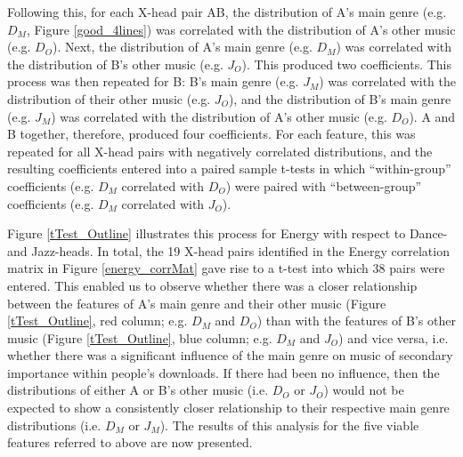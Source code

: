 \documentclass[a4paper]{article}
\begin{document}
Following this, for each X-head pair AB, the distribution of A’s main genre (e.g. $D_M$, Figure \ref{good_4lines}) was correlated with the distribution of A’s other music (e.g. $D_O$). Next, the distribution of A’s main genre (e.g. $D_M$) was correlated with the distribution of B’s other music (e.g. $J_O$). This produced two coefficients. This process was then repeated for B: B’s main genre (e.g. $J_M$) was correlated with the distribution of their other music (e.g. $J_O$), and the distribution of B’s main genre (e.g. $J_M$) was correlated with the distribution of A’s other music (e.g. $D_O$). A and B together, therefore, produced four coefficients. For each feature, this was repeated for all X-head pairs with negatively correlated distributions, and the resulting coefficients entered into a paired sample t-tests in which “within-group” coefficients (e.g. $D_M$ correlated with $D_O$) were paired with “between-group” coefficients (e.g. $D_M$ correlated with $J_O$). 

Figure \ref{tTest_Outline} illustrates this process for Energy with respect to Dance- and Jazz-heads. In total, the 19 X-head pairs identified in the Energy correlation matrix in Figure \ref{energy_corrMat} gave rise to a t-test into which 38 pairs were entered. This enabled us to observe whether there was a closer relationship between the features of A’s main genre and their other music (Figure \ref{tTest_Outline}, red column; e.g. $D_M$ and $D_O$) than with the features of B’s other music (Figure \ref{tTest_Outline}, blue column; e.g. $D_M$ and $J_O$) and vice versa, i.e. whether there was a significant influence of the main genre on music of secondary importance within people’s downloads. If there had been no influence, then the distributions of either A or B’s other music (i.e. $D_O$ or $J_O$) would not be expected to show a consistently closer relationship to their respective main genre distributions (i.e. $D_M$ or $J_M$). The results of this analysis for the five viable features referred to above are now presented. 
\end{document}
